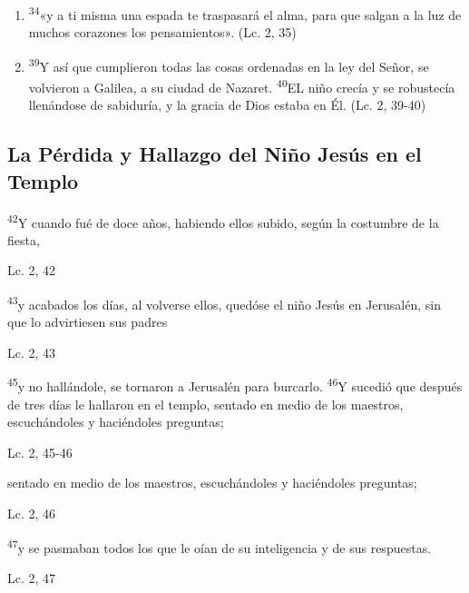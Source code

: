 \documentclass[a4paper,11pt]{article}
\begin{document}
\begin{enumerate}
        \item \textsuperscript{34}«y a ti misma una espada te traspasará el alma, para que salgan a la luz de muchos corazones los pensamientos». (Lc. 2, 35)
        
        \item \textsuperscript{39}Y así que cumplieron todas las cosas ordenadas en la ley del Señor, se volvieron a Galilea, a su ciudad de Nazaret. \textsuperscript{40}EL niño crecía
        y se robustecía llenándose de sabiduría, y la gracia de Dios estaba en Él. (Lc. 2, 39-40)

      \end{enumerate}
            
    \subsection*{\hfil La Pérdida y Hallazgo del Niño Jesús en el Templo \hfil}
      
      \textsuperscript{42}Y cuando fué de doce años, habiendo ellos subido, según la costumbre de la fiesta,
      \begin{flushright}
        Lc. 2, 42     
      \end{flushright}
      
      \textsuperscript{43}y acabados los días, al volverse ellos, quedóse el niño Jesús en Jerusalén, sin que lo advirtiesen sus padres
      \begin{flushright}
        Lc. 2, 43        
      \end{flushright}
      
      \textsuperscript{45}y no hallándole, se tornaron a Jerusalén para burcarlo. \textsuperscript{46}Y sucedió que después de tres días le hallaron en el templo,
      sentado en medio de los maestros, escuchándoles y haciéndoles preguntas;
      \begin{flushright}
        Lc. 2, 45-46       
      \end{flushright}
      
      sentado en medio de los maestros, escuchándoles y haciéndoles preguntas;
      \begin{flushright}
        Lc. 2, 46       
      \end{flushright}
      
      \textsuperscript{47}y se pasmaban todos los que le oían de su inteligencia y de sus respuestas.
      \begin{flushright}
        Lc. 2, 47     
      \end{flushright}
\end{document}
